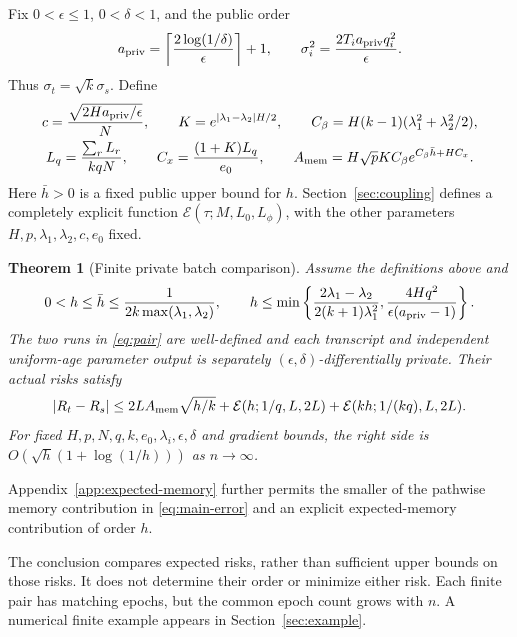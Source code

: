 \documentclass[a4paper,11pt]{article}
\newtheorem{theorem}{Theorem}[section]
\theoremstyle{remark}
\begin{document}
Fix $0<\epsilon\le1$, $0<\delta<1$, and the public order
\begin{equation}\label{eq:privacy-cal}
 a_{\rm priv}=\left\lceil\frac{2\log(1/\delta)}\epsilon\right\rceil+1,
 \qquad \sigma_i^2=\frac{2T_i a_{\rm priv}q_i^2}{\epsilon}.
\end{equation}
Thus $\sigma_t=\sqrt{k}\sigma_s$. Define
\begin{gather}
 c=\frac{\sqrt{2Ha_{\rm priv}/\epsilon}}N,\qquad
 K=e^{|\lambda_1-\lambda_2|H/2},\qquad
 C_\beta=H(k-1)(\lambda_1^2+\lambda_2^2/2),\notag\\
 L_q=\frac{\sum_rL_r}{kqN},\qquad
 C_x=\frac{(1+K)L_q}{e_0},\qquad
 A_{\rm mem}=H\sqrt p K C_\beta e^{C_\beta\bar h+HC_x}.
 \label{eq:memory-constants}
\end{gather}
Here $\bar h>0$ is a fixed public upper bound for $h$.
Section~\ref{sec:coupling} defines a completely explicit function
$\mathcal E(\tau;M,L_0,L_\phi)$, with the other parameters
$H,p,\lambda_1,\lambda_2,c,e_0$ fixed.

\begin{theorem}[Finite private batch comparison]\label{thm:pair}
Assume the definitions above and
\begin{equation}\label{eq:guards}
 0<h\le\bar h\le\frac1{2k\max(\lambda_1,\lambda_2)},\qquad
 h\le\min\left\{
 \frac{2\lambda_1-\lambda_2}{2(k+1)\lambda_1^2},
 \frac{4Hq^2}{\epsilon(a_{\rm priv}-1)}\right\}.
\end{equation}
The two runs in \eqref{eq:pair} are well-defined and each transcript and
independent uniform-age parameter output is separately
$(\epsilon,\delta)$-differentially private. Their actual risks satisfy
\begin{equation}\label{eq:main-error}
 |R_t-R_s|\le
 2L A_{\rm mem}\sqrt{h/k}
 +\mathcal E(h;1/q,L,2L)
 +\mathcal E(kh;1/(kq),L,2L).
\end{equation}
For fixed $H,p,N,q,k,e_0,\lambda_i,\epsilon,\delta$ and gradient bounds,
the right side is $O(\sqrt h(1+\log(1/h)))$ as $n\to\infty$.
\end{theorem}

Appendix~\ref{app:expected-memory} further permits the smaller of the
pathwise memory contribution in \eqref{eq:main-error} and an explicit
expected-memory contribution of order $h$.

The conclusion compares expected risks, rather than sufficient upper bounds
on those risks. It does not determine their order or minimize either risk.
Each finite pair has matching epochs, but the common epoch count grows with
$n$. A numerical finite example appears in Section~\ref{sec:example}.
\end{document}
